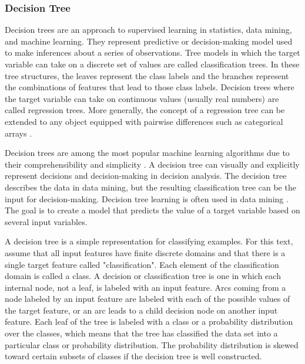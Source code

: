 \documentclass[preprint,12pt]{elsarticle}
\begin{document}
\subsubsection{Decision Tree}

Decision trees are an approach to supervised learning in statistics, data mining, and machine learning. They represent predictive or decision-making model used to make inferences about a series of observations. Tree models in which the target variable can take on a discrete set of values are called classification trees. In these tree structures, the leaves represent the class labels and the branches represent the combinations of features that lead to those class labels. Decision trees where the target variable can take on continuous values (usually real numbers) are called regression trees. More generally, the concept of a regression tree can be extended to any object equipped with pairwise differences such as categorical arrays \cite{Studer2011}.

Decision trees are among the most popular machine learning algorithms due to their comprehensibility and simplicity \cite{Wu2008}. A decision tree can visually and explicitly represent decisions and decision-making in decision analysis. The decision tree describes the data in data mining, but the resulting classification tree can be the input for decision-making. Decision tree learning is often used in data mining \cite{Rokach2014}. The goal is to create a model that predicts the value of a target variable based on several input variables.

A decision tree is a simple representation for classifying examples. For this text, assume that all input features have finite discrete domains and that there is a single target feature called "classification". Each element of the classification domain is called a class. A decision or classification tree is one in which each internal node, not a leaf, is labeled with an input feature. Arcs coming from a node labeled by an input feature are labeled with each of the possible values of the target feature, or an arc leads to a child decision node on another input feature. Each leaf of the tree is labeled with a class or a probability distribution over the classes, which means that the tree has classified the data set into a particular class or probability distribution. The probability distribution is skewed toward certain subsets of classes if the decision tree is well constructed.
\end{document}
